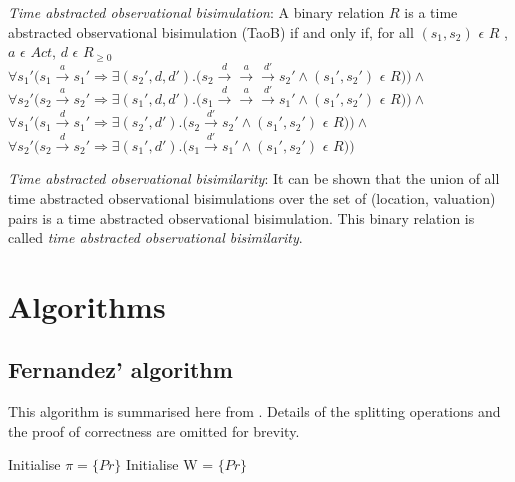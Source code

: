 \documentclass[a4paper]{llncs}
\begin{document}
\begin{definition}
  \emph{Time abstracted observational bisimulation}: A binary relation
  $R$ is a time abstracted observational bisimulation (TaoB) if and only if, for all
  $(s_1, s_2)$ $\epsilon$ $R$ , $a$ $\epsilon$ $Act $, $d$ $\epsilon$ $R_{\ge 0}$\\
  $\forall s_1' (s_1 \xrightarrow{a} s_1' \Rightarrow \exists (s_2',
  d, d') . (s_2 \xrightarrow{d} \xrightarrow{a} \xrightarrow{d'} s_2'
  \wedge (s_1', s_2')$ $\epsilon$ $R ) ) \wedge $ \\
  $\forall s_2' (s_2 \xrightarrow{a} s_2' \Rightarrow \exists (s_1',
  d, d') . (s_1 \xrightarrow{d} \xrightarrow{a} \xrightarrow{d'} s_1'
  \wedge (s_1', s_2')$ $\epsilon$ $R ) ) \wedge $ \\
  $\forall s_1' (s_1 \xrightarrow{d} s_1' \Rightarrow \exists (s_2',
  d')
  . (s_2 \xrightarrow{d'} s_2' \wedge (s_1', s_2')$ $\epsilon$ $R ) )
  \wedge $ \\
  $\forall s_2' (s_2 \xrightarrow{d} s_2' \Rightarrow \exists (s_1', d')
  . (s_1 \xrightarrow{d'} s_1' \wedge (s_1', s_2')$ $\epsilon$ $R ) ) $ \\
\end{definition}

\begin{definition}
  \emph{Time abstracted observational bisimilarity}: It can be shown that
  the union of all time abstracted observational bisimulations over the
  set of (location, valuation) pairs is a time abstracted observational
  bisimulation. This binary relation is called \textit{time abstracted
    observational bisimilarity}.
\end{definition}


\section{Algorithms}

\subsection{Fernandez' algorithm}

This algorithm is summarised here from
\cite{fernandez1990implementation}. Details of the splitting operations
and the proof of correctness are omitted for brevity.

\begin{algorithm2e}[H]
  Initialise $\pi = \{Pr\}$\;
  Initialise W = $\{Pr\}$
\end{algorithm2e}
\end{document}
